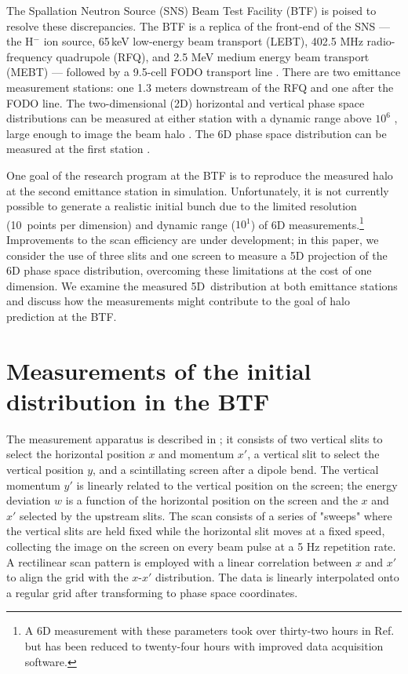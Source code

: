 \documentclass[letterpaper,
               nospread,
               biblatex,
              ]{jacow}
\begin{document}
The Spallation Neutron Source (SNS) Beam Test Facility (BTF) is poised to resolve these discrepancies. The BTF is a replica of the front-end of the SNS — the H$^-$ ion source, 65\,keV low-energy beam transport (LEBT), 402.5 MHz radio-frequency quadrupole (RFQ), and 2.5 MeV medium energy beam transport (MEBT) — followed by a 9.5-cell FODO transport line \cite{Zhang2020}. There are two emittance measurement stations: one 1.3 meters downstream of the RFQ and one after the FODO line. The two-dimensional (2D) horizontal and vertical phase space distributions can be measured at either station with a dynamic range above $10^6$ \cite{Aleksandrov2021}, large enough to image the beam halo \cite{Aleksandrov2020}. The 6D phase space distribution can be measured at the first station \cite{Cathey2018}. 

One goal of the research program at the BTF is to reproduce the measured halo at the second emittance station in simulation. Unfortunately, it is not currently possible to generate a realistic initial bunch due to the limited resolution (10~points per dimension) and dynamic range ($10^1$) of 6D measurements.\footnote{A 6D measurement with these parameters took over thirty-two hours in Ref. \cite{Cathey2018} but has been reduced to twenty-four hours with improved data acquisition software.} Improvements to the scan efficiency are under development; in this paper, we consider the use of three slits and one screen to measure a 5D projection of the 6D phase space distribution, overcoming these limitations at the cost of one dimension. We examine the measured 5D~distribution at both emittance stations and discuss how the measurements might contribute to the goal of halo prediction at the BTF.

\section{Measurements of the initial distribution in the BTF}

The measurement apparatus is described in \cite{Ruisard2022-NAPAC}; it consists of two vertical slits to select the horizontal position $x$ and momentum $x'$, a vertical slit to select the vertical position $y$, and a scintillating screen after a dipole bend. The vertical momentum $y'$ is linearly related to the vertical position on the screen; the energy deviation $w$ is a function of the horizontal position on the screen and the $x$ and $x'$ selected by the upstream slits. The scan consists of a series of "sweeps" where the vertical slits are held fixed while the horizontal slit moves at a fixed speed, collecting the image on the screen on every beam pulse at a 5 Hz repetition rate. A rectilinear scan pattern is employed with a linear correlation between $x$ and $x'$ to align the grid with the $x$-$x'$ distribution. The data is linearly interpolated onto a regular grid after transforming to phase space coordinates.
\end{document}
